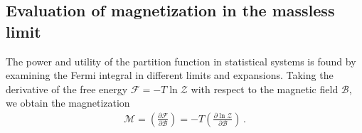 \documentclass[epjST]{svjour}
\begin{document}
\subsection{Evaluation of magnetization in the massless limit}
\label{sec:magnetization_evaluation}
The power and utility of the partition function in statistical systems is found by examining the Fermi integral in different limits and expansions. Taking the derivative of the free energy \(\mathcal{F} = -T \ln\mathcal{Z}\) with respect to the magnetic field \(\mathcal{B}\), we obtain the magnetization
\begin{align}
\label{eq:magnetization_def}
\mathcal{M} = \left( \frac{\partial \mathcal{F}}{\partial \mathcal{B}} \right) = -T \left( \frac{\partial \ln\mathcal{Z}}{\partial \mathcal{B}} \right)\,.
\end{align} 
\end{document}
